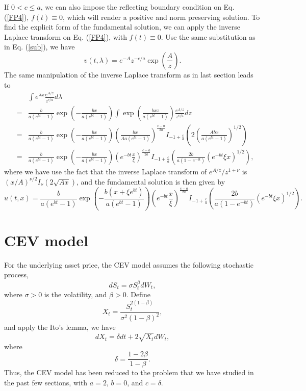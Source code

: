 \documentclass[12pt]{article}
\begin{document}
    If $0<c\le a$,
    we can also impose the reflecting boundary condition on Eq. (\ref{FP4}), $f(t)\equiv 0$, which will render a positive
    and norm preserving solution. To find the 
    explicit form of the fundamental solution, we can apply the inverse Laplace transform on Eq. (\ref{FP4}), with $f(t)\equiv 0$.
    Use the same substitution as in Eq. (\ref{sub}),
    we have
    \begin{equation}
      v(t,\lambda) = e^{-A}z^{-c/a}\exp\left(\frac{A}{z}\right).
    \end{equation}
    The same manipulation of the inverse Laplace transform as in last section leads to
    \begin{eqnarray}
      &&\int e^{\lambda x} \frac{e^{A/z}}{z^{c/a}}d\lambda\nonumber\\
      &=& \frac{b}{a(e^{bt}-1)}\exp\left(-\frac{bx}{a(e^{bt}-1)}\right)\int \exp\left(\frac{bxz}{a(e^{bt}-1)}\right)\frac{e^{A/z}}{z^{c/a}}dz \nonumber\\
      &=& \frac{b}{a(e^{bt}-1)}\exp\left(-\frac{bx}{a(e^{bt}-1)}\right)\left(\frac{bx}{Aa(e^{bt}-1)}\right)^{\frac{c-a}{2a}}I_{-1+\frac{c}{a}}\left(2\left(\frac{Abx}{a(e^{bt}-1)}\right)^{1/2}\right) \nonumber\\
      &=& \frac{b}{a(e^{bt}-1)}\exp\left(-\frac{bx}{a(e^{bt}-1)}\right)\left(e^{-bt}\frac{x}{\xi}\right)^{\frac{c-a}{2a}}I_{-1+\frac{c}{a}}\left(\frac{2b}{a(1-e^{-bt})}\left(e^{-bt}\xi x\right)^{1/2}\right),
    \end{eqnarray}
    where we have use the fact that the inverse Laplace transform of $e^{A/z}/z^{1+\nu}$ is $(x/A)^{\nu/2}I_{\nu}(2\sqrt{Ax})$, 
    and the fundamental solution is then given by
    \begin{equation}
      u(t,x)=\frac{b}{a(e^{bt}-1)}\exp\left(-\frac{b(x+\xi e^{bt})}{a(e^{bt}-1)}\right)\left(e^{-bt}\frac{x}{\xi}\right)^{\frac{c-a}{2a}}I_{-1+\frac{c}{a}}\left(\frac{2b}{a(1-e^{-bt})}\left(e^{-bt}\xi x\right)^{1/2}\right).
    \end{equation}



\section{CEV model}

  For the underlying asset price, the CEV model assumes the following stochastic process,
  \begin{equation}
    dS_t=\sigma S_t^{\beta}dW_t,
  \end{equation}
  where $\sigma>0$ is the volatility, and $\beta>0$. Define
  \begin{equation}
    X_t=\frac{S_t^{2(1-\beta)}}{\sigma^2(1-\beta)^2},
  \end{equation}
  and apply the Ito's lemma, we have
  \begin{equation}
    dX_t = \delta dt + 2\sqrt{X_t}dW_t,
  \end{equation}
  where
  \begin{equation}
    \delta = \frac{1-2\beta}{1-\beta}.
  \end{equation}
  Thus, the CEV model has been reduced to the problem that we have studied in the past few sections, with
  $a=2$, $b=0$, and $c=\delta$.
\end{document}
